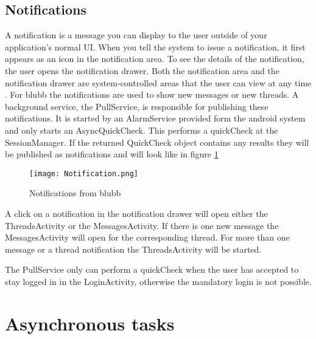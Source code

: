 \documentclass[12pt,a4paper,oneside]{report}
\newcommand{\appname}{blubb}
\begin{document}
\subsection{Notifications} \label{subsec:notifications}
A notification is a message you can display to the user outside of your application's normal UI. When you tell the system to issue a notification, it first appears as an icon in the notification area. To see the details of the notification, the user opens the notification drawer. Both the notification area and the notification drawer are system-controlled areas that the user can view at any time \citep{aDefNotifications}.
For \appname{} the notifications are used to show new messages or new threads. A background service, the PullService, is responsible for publishing these notifications. It is started by an AlarmService provided form the android system and only starts an AsyncQuickCheck. This performs a quickCheck at the SessionManager. If the returned QuickCheck object contains any results they will be published as notifications and will look like in figure \ref{fig:notifications}

\begin{figure}[!ht]
    \texttt{[image: Notification.png]}
	\caption{Notifications from \appname{}} 
	\label{fig:notifications}
\end{figure}

A click on a notification in the notification drawer will open either the ThreadsActivity or the MessagesActivity. If there is one new message the MessagesActivity will open for the corresponding thread. For more than one message or a thread notification the ThreadsActivity will be started.

The PullService only can perform a quickCheck when the user has accepted to stay logged in in the LoginActivity, otherwise the mandatory login is not possible.

\section{Asynchronous tasks} \label{sec:AsyncTasks}
\end{document}
